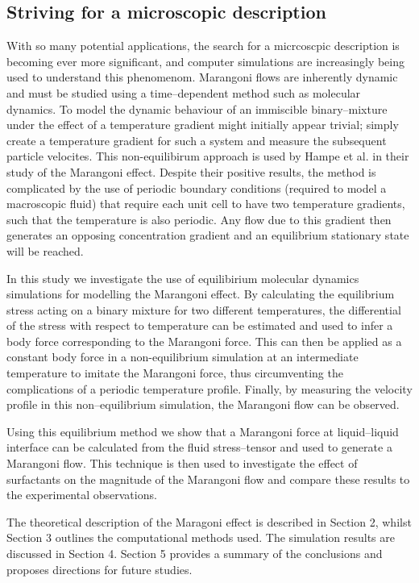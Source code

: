 \subsection{Striving for a microscopic description}
With so many potential applications, the search for a micrcoscpic description is becoming ever more significant, and computer simulations are increasingly being used to understand this phenomenom.
Marangoni flows are inherently dynamic and must be studied using a time--dependent method such as molecular dynamics.
To model the dynamic behaviour of an immiscible binary--mixture under the effect of a temperature gradient might initially appear trivial; simply create a temperature gradient for such a system and measure the subsequent particle velocites.
This non-equilibirum approach is used by Hampe et al. in their study of the Marangoni effect.\cite{HolgerBoppHampe}
Despite their positive results, the method is complicated by the use of periodic boundary conditions (required to model a macroscopic fluid) that require each unit cell to have two temperature gradients, such that the temperature is also periodic.
Any flow due to this gradient then generates an opposing concentration gradient and an equilibrium stationary state will be reached.

In this study we investigate the use of equilibirium molecular dynamics simulations for modelling the Marangoni effect.
By calculating the equilibrium stress acting on a binary mixture for two different temperatures, the differential of the stress with respect to temperature can be estimated and used to infer a body force corresponding to the Marangoni force.
This can then be applied as a constant body force in a non-equilibrium simulation at an intermediate temperature to imitate the Marangoni force, thus circumventing the complications of a periodic temperature profile.
Finally, by measuring the velocity profile in this non--equilibrium simulation, the Marangoni flow can be observed.

Using this equilibrium method we show that a Marangoni force at liquid--liquid interface can be calculated from the fluid stress--tensor and used to generate a Marangoni flow.
This technique is then used to investigate the effect of surfactants on the magnitude of the Marangoni flow and compare these results to the experimental observations.

The theoretical description of the Maragoni effect is described in Section 2, whilst Section 3 outlines the computational methods used.
The simulation results are discussed in Section 4.
Section 5 provides a summary of the conclusions and proposes directions for future studies.
